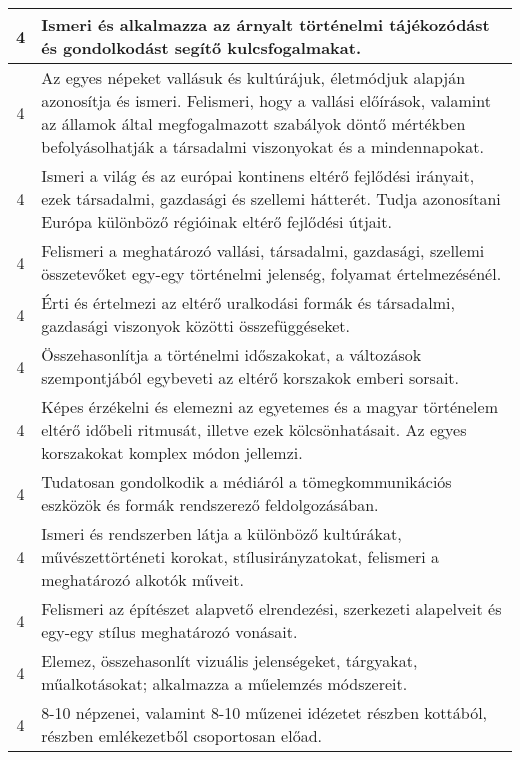 \begin{longtable}{c | p{12cm} }
                                          4 &  Ismeri és alkalmazza az árnyalt történelmi tájékozódást és gondolkodást segítő kulcsfogalmakat. \\ \hline
                                          4 &  Az egyes népeket vallásuk és kultúrájuk, életmódjuk alapján azonosítja és ismeri. Felismeri, hogy a vallási előírások, valamint az államok által megfogalmazott szabályok döntő mértékben befolyásolhatják a társadalmi viszonyokat és a mindennapokat. \\ \hline
                                          4 &  Ismeri a világ és az európai kontinens eltérő fejlődési irányait, ezek társadalmi, gazdasági és szellemi hátterét. Tudja azonosítani Európa különböző régióinak eltérő fejlődési útjait. \\ \hline
                                          4 &  Felismeri a meghatározó vallási, társadalmi, gazdasági, szellemi összetevőket egy-egy történelmi jelenség, folyamat értelmezésénél. \\ \hline
                                          4 &  Érti és értelmezi az eltérő uralkodási formák és társadalmi, gazdasági viszonyok közötti összefüggéseket. \\ \hline
                                          4 &  Összehasonlítja a történelmi időszakokat, a változások szempontjából egybeveti az eltérő korszakok emberi sorsait. \\ \hline
                                          4 &  Képes érzékelni és elemezni az egyetemes és a magyar történelem eltérő időbeli ritmusát, illetve ezek kölcsönhatásait. Az egyes korszakokat komplex módon jellemzi. \\ \hline
                                          4 &  Tudatosan gondolkodik a médiáról a tömegkommunikációs eszközök és formák rendszerező feldolgozásában. \\ \hline
                                          4 &  Ismeri és rendszerben látja a különböző kultúrákat, művészettörténeti korokat, stílusirányzatokat, felismeri a meghatározó alkotók műveit. \\ \hline
                                          4 &  Felismeri az építészet alapvető elrendezési, szerkezeti alapelveit és egy-egy stílus meghatározó vonásait. \\ \hline
                                          4 &  Elemez, összehasonlít vizuális jelenségeket, tárgyakat, műalkotásokat; alkalmazza a műelemzés módszereit. \\ \hline
                                          4 &  8-10 népzenei, valamint 8-10 műzenei idézetet részben kottából, részben emlékezetből csoportosan előad. \\ \hline

\end{longtable}
